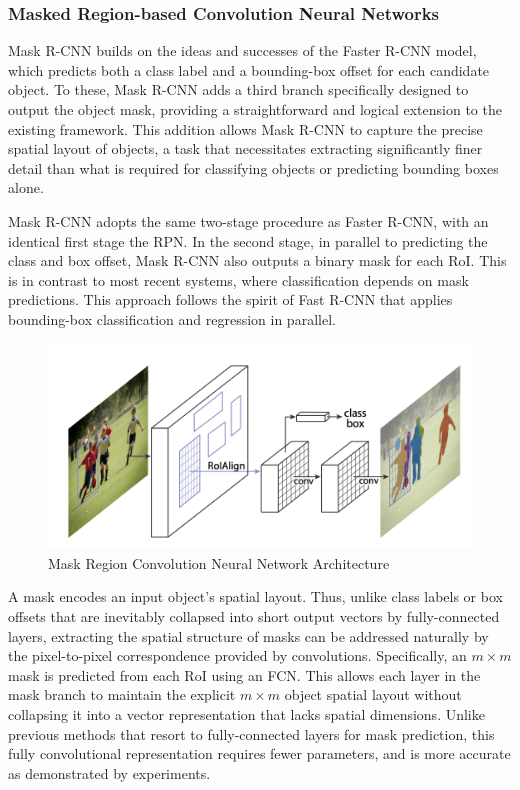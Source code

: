 \subsubsection{Masked Region-based Convolution Neural Networks}

Mask R-CNN builds on the ideas and successes of the Faster R-CNN model, which predicts both a class label and a bounding-box offset for each candidate object. 
To these, Mask R-CNN adds a third branch specifically designed to output the object mask, providing a straightforward and logical extension to the 
existing framework. This addition allows Mask R-CNN to capture the precise spatial layout of objects, a task that necessitates extracting significantly 
finer detail than what is required for classifying objects or predicting bounding boxes alone.

Mask R-CNN adopts the same two-stage procedure as Faster R-CNN, with an identical first stage the RPN. In the second stage, in parallel to predicting 
the class and box offset, Mask R-CNN also outputs a binary mask for each RoI. This is in contrast to most recent systems, where classification 
depends on mask predictions. This approach follows the spirit of Fast R-CNN that applies bounding-box classification and regression in parallel.


\begin{figure}[h!]
    \centering
    \includegraphics[scale=0.5]{Figures/mask-r-cnn.png}
    \caption{Mask Region Convolution Neural Network Architecture}
    \label{fig:mask-r-cnn}
\end{figure}

\newpage
A mask encodes an input object’s spatial layout. Thus, unlike class labels or box offsets that are inevitably collapsed into short output vectors by
fully-connected layers, extracting the spatial structure of masks can be addressed naturally by the pixel-to-pixel correspondence provided by convolutions.
Specifically, an $m \times m$ mask is predicted from each RoI using an FCN. This allows each layer in the mask branch to maintain the explicit $m \times m$ object 
spatial layout without collapsing it into a vector representation that lacks spatial dimensions. Unlike previous methods that resort to fully-connected layers 
for mask prediction, this fully convolutional representation requires fewer parameters, and is more accurate as demonstrated by experiments.

